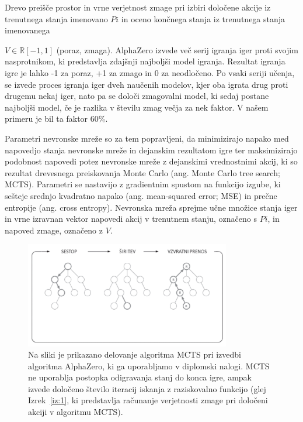 \documentclass[a4paper, 12pt]{book}
\begin{document}
Drevo preišče prostor in vrne verjetnost zmage pri izbiri določene akcije iz trenutnega stanja imenovano $Pi$ in oceno končnega stanja iz trenutnega stanja imenovanega {$V\in\mathbb{R}[-1, 1]$ (poraz, zmaga).
AlphaZero izvede več serij igranja iger proti svojim nasprotnikom, ki predstavlja zdajšnji najboljši model igranja.
Rezultat igranja igre je lahko -1 za poraz, +1 za zmago in 0 za neodločeno.
Po vsaki seriji učenja, se izvede proces igranja iger dveh naučenih modelov, kjer oba igrata drug proti drugemu nekaj iger, nato pa se določi zmagovalni model, ki sedaj postane najboljši model, če je razlika v številu zmag večja za nek faktor.
V našem primeru je bil ta faktor 60\%.

Parametri nevronske mreže so za tem popravljeni, da minimizirajo napako med napovedjo stanja nevronske mreže in dejanskim rezultatom igre ter maksimizirajo podobnost napovedi potez nevronske mreže z dejanskimi vrednostnimi akcij, ki so rezultat drevesnega preiskovanja Monte Carlo (ang. Monte Carlo tree search; MCTS). 
Parametri se nastavijo z gradientnim spustom na funkcijo izgube, ki sešteje srednjo kvadratno napako (ang. mean-squared error; MSE) in prečne entropije (ang. cross entropy).
Nevronska mreža sprejme učne množice stanja iger in vrne izravnan vektor napovedi akcij v trenutnem stanju, označeno s $Pi$, in napoved zmage, označeno z $V$.

\begin{figure}[h!]
	\begin{center}
		\includegraphics[width=0.8\textwidth]{photos/modifiedMCTS.pdf}
	\end{center}
	\caption{Na sliki je prikazano delovanje algoritma MCTS pri izvedbi algoritma AlphaZero, ki ga uporabljamo v diplomski nalogi. 
		MCTS ne uporablja postopka odigravanja stanj do konca igre, ampak izvede določeno število iteracij iskanja z raziskovalno funkcijo (glej Izrek~\ref{iz:1}, ki predstavlja računanje verjetnosti zmage pri določeni akciji v algoritmu MCTS).}
	\label{modifiedMCTS}
\end{figure}

}
\end{document}
